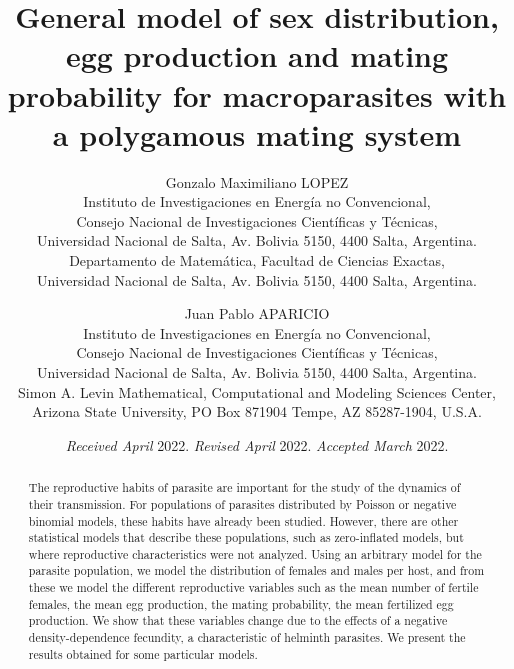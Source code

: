 \documentclass[useAMS,referee,usenatbib]{biom}
\title[General model of sex distribution, egg production and mating probability]{General model of sex distribution, egg production and mating probability for macroparasites with a polygamous mating system}
\author
{Gonzalo Maximiliano LOPEZ\emailx{gonzalo.maximiliano.lopez@gmail.com} \\
Instituto de Investigaciones en Energ\'ia no Convencional,\\
Consejo Nacional de Investigaciones Cient\'ificas y T\'ecnicas,\\
Universidad Nacional de Salta, Av. Bolivia 5150, 4400 Salta, Argentina.\\
Departamento de Matem\'atica, Facultad de Ciencias Exactas, \\
Universidad Nacional de Salta, Av. Bolivia 5150, 4400 Salta, Argentina.
\and
Juan Pablo APARICIO\emailx{juan.p.aparicio@gmail.com} \\
Instituto de Investigaciones en Energ\'ia no Convencional,\\
Consejo Nacional de Investigaciones Cient\'ificas y T\'ecnicas,\\
Universidad Nacional de Salta, Av. Bolivia 5150, 4400 Salta, Argentina.\\
Simon A. Levin Mathematical, Computational and Modeling Sciences Center,\\
Arizona State University, PO Box 871904 Tempe, AZ 85287-1904, U.S.A.
}
\begin{document}

\date{{\it Received April} 2022. {\it Revised April} 2022.  {\it
Accepted March} 2022.}



\pagerange{\pageref{firstpage}--\pageref{lastpage}} 




\label{firstpage}


\begin{abstract}
The reproductive habits of parasite are important for the study of the dynamics of their transmission. 	For populations of parasites distributed by Poisson or negative binomial models, these habits have already been studied. 
However, there are other statistical models that describe these populations, such as zero-inflated models, but where reproductive characteristics were not analyzed. Using an arbitrary model for the parasite population, we model the distribution of females and males per host, and from these we model the different reproductive variables such as the mean number of fertile females, the mean egg production, the mating probability, the mean fertilized egg production.
We show that these variables change due to the effects of a negative density-dependence fecundity, a characteristic of helminth parasites. We present the results obtained for some particular models.
\end{abstract}
\end{document}
